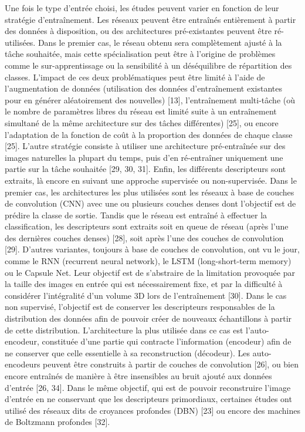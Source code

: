 \documentclass[]{memoir}
\begin{document}
Une fois le type d’entrée choisi, les études peuvent varier en fonction de leur stratégie d’entraînement. Les réseaux peuvent être entraînés entièrement à partir des données à disposition, ou des architectures pré-existantes peuvent être ré-utilisées.
Dans le premier cas, le réseau obtenu sera complètement ajusté à la tâche souhaitée, mais cette spécialisation peut être à l’origine de problèmes comme le sur-apprentissage ou la sensibilité à un déséquilibre de répartition des classes.
L’impact de ces deux problématiques peut être limité à l’aide de l’augmentation de données (utilisation des données d’entraînement existantes pour en générer aléatoirement des nouvelles) [13], l’entraînement multi-tâche (où le nombre de paramètres libres du réseau est limité suite à un entraînement simultané de la même architecture sur des tâches différentes) [25], ou encore l’adaptation de la fonction de coût à la proportion des données de chaque classe [25].
L’autre stratégie consiste à utiliser une architecture pré-entraînée sur des images naturelles la plupart du temps, puis d’en ré-entraîner uniquement une partie sur la tâche souhaitée [29, 30, 31].
Enfin, les différents descripteurs sont extraits, là encore en suivant une approche supervisée ou non-supervisée.
Dans le premier cas, les architectures les plus utilisées sont les réseaux à base de couches de convolution (CNN) avec une ou plusieurs couches denses dont l’objectif est de prédire la classe de sortie. Tandis que le réseau est entraîné à effectuer la classification, les descripteurs sont extraits soit en queue de réseau (après l’une des dernières couches denses) [28], soit après l’une des couches de convolution [29].
D’autres variantes, toujours à base de couches de convolution, ont vu le jour, comme le RNN (recurrent neural network), le LSTM (long-short-term memory) ou le Capsule Net.
Leur objectif est de s’abstraire de la limitation provoquée par la taille des images en entrée qui est nécessairement fixe, et par la difficulté à considérer l’intégralité d’un volume 3D lors de l’entraînement [30].
Dans le cas non supervisé, l’objectif est de conserver les descripteurs responsables de la distribution des données afin de pouvoir créer de nouveaux échantillons à partir de cette distribution. L’architecture la plus utilisée dans ce cas est l’auto-encodeur, constituée d’une partie qui contracte l’information (encodeur) afin de ne conserver que celle essentielle à sa reconstruction (décodeur). Les auto-encodeurs peuvent être construits à partir de couches de convolution [26], ou bien encore entraînés de manière à être insensibles au bruit ajouté aux données d’entrée [26, 34]. Dans le même objectif, qui est de pouvoir reconstruire l’image d’entrée en ne conservant que les descripteurs primordiaux, certaines études ont utilisé des réseaux dits de croyances profondes (DBN) [23] ou encore des machines de Boltzmann profondes [32].
\end{document}
